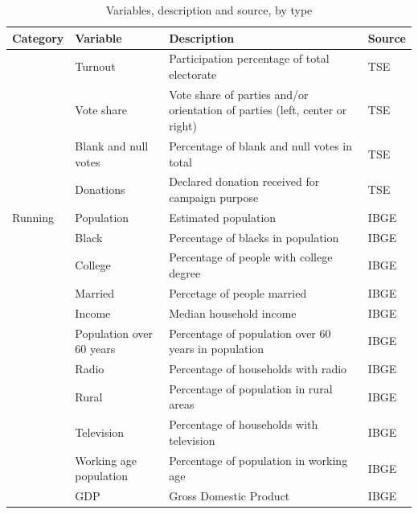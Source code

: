 \documentclass[
  12pt,
]{article}
\begin{document}
\begin{table}[!h]

\caption{\label{tab:variables}Variables, description and source, by type}
\centering
\fontsize{9}{11}\selectfont
\begin{tabu} to 
\toprule
Category & Variable & Description & Source\\
\midrule
 & Turnout & Participation percentage of total electorate & TSE\\

 & Vote share & Vote share of parties and/or orientation of parties (left, center or right) & TSE\\

 & Blank and null votes & Percentage of blank and null votes in total & TSE\\

 & Donations & Declared donation received for campaign purpose & TSE\\
Running & Population & Estimated population & IBGE\\
 & Black & Percentage of blacks in population & IBGE\\

 & College & Percentage of people with college degree & IBGE\\

 & Married & Percetage of people married & IBGE\\

 & Income & Median household income & IBGE\\

 & Population over 60 years & Percentage of population over 60 years in population & IBGE\\

 & Radio & Percentage of households with radio & IBGE\\

 & Rural & Percentage of population in rural areas & IBGE\\

 & Television & Percentage of households with television & IBGE\\

 & Working age population & Percentage of population in working age & IBGE\\

 & GDP & Gross Domestic Product & IBGE\\


\end{tabu}
\end{table}
\end{document}

